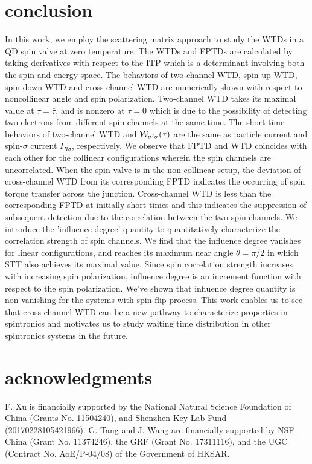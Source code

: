 \documentclass[aps,prb,twocolumn,footinbib,showpacs,superscriptaddress,preprintnumbers,amsmath,amssymb]{revtex4-1}
\begin{document}
\section{conclusion}\label{sec4}
In this work, we employ the scattering matrix approach to study the WTDs in a QD spin valve at zero temperature. 
The WTDs and FPTDs are calculated by taking derivatives with respect to the ITP which is a determinant involving both the spin and energy space.
The behaviors of two-channel WTD, spin-up WTD, spin-down WTD and cross-channel WTD are numerically shown with respect to noncollinear angle and spin polarization. 
Two-channel WTD takes its maximal value at $\tau=\bar{\tau}$, and is nonzero at $\tau=0$ which is due to the possibility of detecting two electrons from different spin channels at the same time. 
The short time behaviors of two-channel WTD and ${\cal W}_{\sigma'\sigma}(\tau)$ are the same as particle current and spin-$\sigma$ current $I_{R\sigma}$, respectively.	
	We observe that FPTD and WTD coincides with each other for the collinear configurations wherein the spin channels are uncorrelated. When the spin valve is in the non-collinear setup, the deviation of cross-channel WTD from its corresponding FPTD indicates the occurring of spin torque transfer across the junction. Cross-channel WTD is less than the corresponding FPTD at initially short times and this indicates the suppression of subsequent detection due to the correlation between the two spin channels. We introduce the 'influence degree' quantity to quantitatively characterize the correlation strength of spin channels. 
We find that the influence degree vanishes for linear configurations, and reaches its maximum near angle $\theta =\pi/2$ in which STT also achieves its maximal value. Since spin correlation strength increases with increasing spin polarization, influence degree is an increment function with respect to the spin polarization. We've shown that influence degree quantity is non-vanishing for the systems with spin-flip process.
	This work enables us to see that cross-channel WTD can be a new pathway to characterize properties in spintronics and motivates us to study waiting time distribution in other spintronics systems in the future. 



\section{acknowledgments}
F. Xu is financially supported by the National Natural Science Foundation of China (Grants No. 11504240), and Shenzhen Key Lab Fund (20170228105421966). G. Tang and J. Wang are financially supported by NSF-China (Grant No. 11374246), the GRF (Grant No. 17311116), and the UGC (Contract No. AoE/P-04/08) of the Government of HKSAR. 
\end{document}
